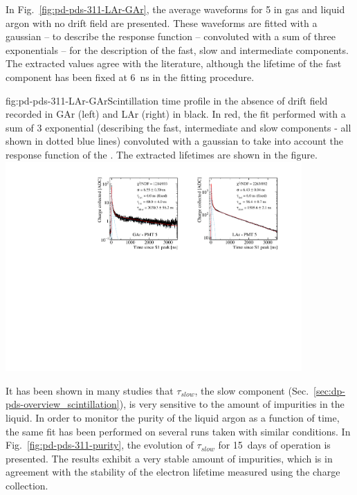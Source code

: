 In Fig.~\ref{fig:pd-pds-311-LAr-GAr}, the average waveforms for  5 in gas and liquid argon with no drift field are presented. These waveforms are fitted with a gaussian -- to describe the response function -- convoluted with a sum of three exponentials -- for the description of the fast, slow and intermediate components. 
The extracted values agree with the literature, although the lifetime of the fast component has been fixed at \SI{6}{ns} in the fitting procedure.


\begin{dunefigure}{fig:pd-pds-311-LAr-GAr}{Scintillation time profile in the absence of drift field recorded in GAr (left) and LAr (right) in black. In red, the fit performed with a sum of 3 exponential (describing the fast, intermediate and slow components - all shown in dotted blue lines) convoluted with a gaussian to take into account the response function of the . The extracted lifetimes are shown in the figure.}
\includegraphics[width=0.85\textwidth]{graphics/dppd_311_lar_gar_fit.pdf}
\end{dunefigure}

It has been shown in many studies that $\tau_{slow}$, the slow component (Sec.~\ref{sec:dp-pds-overview_scintillation}), is very sensitive to the amount of impurities in the liquid.
In order to monitor the purity of the liquid argon as a function of time, the same fit has been performed on several runs taken with similar conditions. 
In Fig.~\ref{fig:pd-pds-311-purity}, the evolution of $\tau_{slow}$ for \SI{15}{days} of operation is presented.
The results exhibit a very stable amount of impurities, which is in agreement with the stability of the electron lifetime measured using the charge collection.

